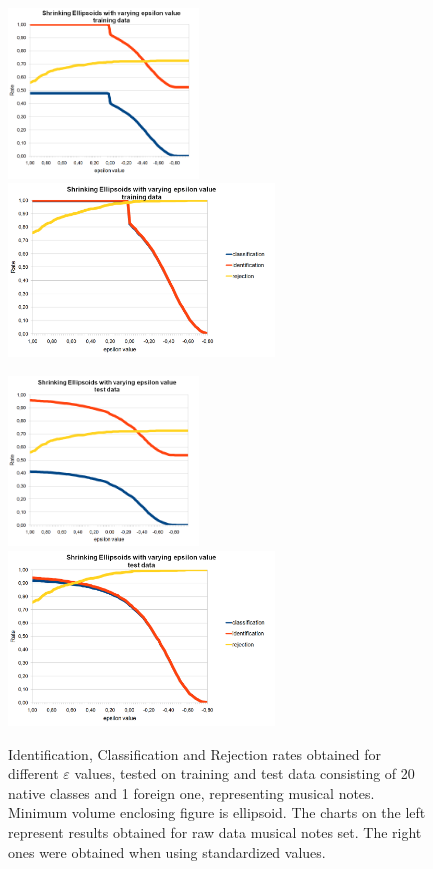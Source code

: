 \begin{figure}[htp]
	\centering
	\centerline{
	\includegraphics[width=0.45\textwidth]{Figures/charts/MUSIC_NOTES/DIGITS_ShrinkingEllipsoidsToleranceTraining_cropped.png}
	\includegraphics[width=0.63\textwidth]{Figures/charts/MUSIC_NOTES_STANDARIZED/DIGITS_ShrinkingEllipsoidsToleranceTraining.png}}
	\hspace{12pt}
	\centerline{
	\includegraphics[width=0.45\textwidth]{Figures/charts/MUSIC_NOTES/DIGITS_ShrinkingEllipsoidsToleranceTest_cropped.png}
	\includegraphics[width=0.63\textwidth]{Figures/charts/MUSIC_NOTES_STANDARIZED/DIGITS_ShrinkingEllipsoidsToleranceTest.png}}
	\caption{ Identification, Classification and Rejection rates obtained for different $\varepsilon$ values, tested on training and test data consisting of 20 native classes and 1 foreign one, representing musical notes. Minimum volume enclosing figure is ellipsoid. The charts on the left represent results obtained for raw data musical notes set. The right ones were obtained when using standardized values. }
	\label{fig:shrinking_music_notes}
\end{figure}


